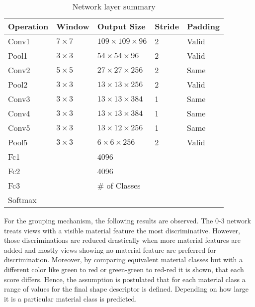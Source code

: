 \begin{table}[]
\centering
\caption{Network layer summary}
\label{tab:network-layers}
	\begin{tabular}{lllll}
		Operation & Window       & Output Size                & Stride & Padding \\ \hline
		Conv1     & $7 \times 7$ & $109 \times 109 \times 96$ & 2      & Valid   \\
		Pool1     & $3 \times 3$ & $54 \times 54 \times 96$   & 2      & Valid   \\ \hline
		Conv2     & $5 \times 5$ & $27 \times 27 \times 256$  & 2      & Same    \\
		Pool2     & $3 \times 3$ & $13 \times 13 \times 256$  & 2      & Valid   \\ \hline
		Conv3     & $3 \times 3$ & $13 \times 13 \times 384$  & 1      & Same    \\ \hline
		Conv4     & $3 \times 3$ & $13 \times 13 \times 384$  & 1      & Same    \\ \hline
		Conv5     & $3 \times 3$ & $13 \times 12 \times 256$  & 1      & Same    \\
		Pool5     & $3 \times 3$ & $6 \times 6 \times 256$    & 2      & Valid   \\ \hline
		Fc1       &              & 4096                       &        &         \\ \hline
		Fc2       &              & 4096                       &        &         \\ \hline
		Fc3       &              & \# of Classes              &        &         \\ \hline
		Softmax   &              &                            &        &         \\ \hline
	\end{tabular}
\end{table}

For the grouping mechanism, the following results are observed.
The 0-3 network treats views with a visible material feature the most discriminative.
However, those discriminations are reduced drastically when more material features are added and mostly views showing no material feature are preferred for discrimination.
Moreover, by comparing equivalent material classes but with a different color like green to red or green-green to red-red it is shown, that each score differs.
Hence, the assumption is postulated that for each material class a range of values for the final shape descriptor is defined.
Depending on how large it is a particular material class is predicted.

